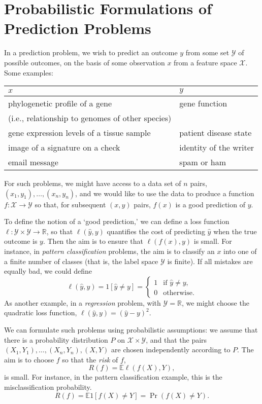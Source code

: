 \documentclass[twoside]{article}
\theoremstyle{definition}
\theoremstyle{definition}
\theoremstyle{remark}
\def\R{{\mathbb R}}
\def\X{{\mathcal X}}
\def\Y{{\mathcal Y}}
\def\E{{\mathbb E}}
\begin{document}
\section{Probabilistic Formulations of Prediction Problems}

In a prediction problem, we wish to predict an outcome $y$ from some
set $\Y$ of possible outcomes, on the basis of some observation $x$
from a feature space $\X$. Some examples:\\
\begin{tabular}{|l|l|}
\hline
$x$	&	$y$ \\
\hline
phylogenetic profile
of a gene
& gene function \\
(i.e., relationship to genomes of other species) & \\
gene expression levels of a tissue sample
& patient disease state \\
image of a signature on a check
& identity of the writer \\
email message
& spam or ham\\
\hline
\end{tabular}

For such problems, we might have access to a data set of $n$ pairs,
$(x_1,y_1), \ldots,(x_n,y_n)$, and we would like to use the data to
produce a function $f:\X\to\Y$ so that, for subsequent $(x,y)$ pairs,
$f(x)$ is a good prediction of $y$.

To define the notion of a `good prediction,' we can define a loss
function $\ell:\Y\times\Y\to\R$, so that $\ell(\hat y, y)$
quantifies the cost of
predicting $\hat y$ when the true outcome is $y$. Then the
aim is to ensure that $\ell(f(x),y)$ is
small. For instance, in {\em pattern classification} problems, the
aim is to classify an $x$ into one of a finite number of classes (that
is, the label space $\Y$ is finite). If all mistakes are
equally bad, we could define
  \[
    \ell(\hat y,y) = 1[\hat y\not=y]
    =\begin{cases}
    1 & \text{if $\hat y\not= y$,}\\
    0 & \text{otherwise.}\end{cases}
  \]
As another example, in a {\em regression} problem, with $\Y=\R$, we might
choose the quadratic loss function, $\ell(\hat y,y)=(\hat y-y)^2$.

We can formulate such problems using probabilistic assumptions:
we assume that there is a probability distribution $P$ on
$\X\times\Y$, and that the pairs $(X_1,Y_1),\ldots,(X_n,Y_n),(X,Y)$
are chosen independently according to $P$. The aim is to choose $f$ so
that the {\em risk} of $f$,
\[
  R(f) = \E\ell(f(X),Y),
\]
is small. For instance, in the pattern classification example,
this is the misclassification probability.
\[
  R(f) = \E 1[f(X)\not=Y] = \Pr(f(X)\not=Y).
\]
\end{document}
